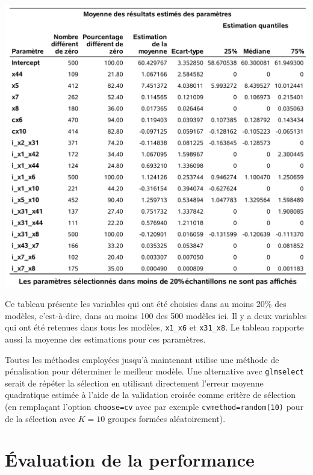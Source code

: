 \documentclass[
  11pt,
  letterpaper,
]{book}
\theoremstyle{definition}
\theoremstyle{definition}
\theoremstyle{definition}
\theoremstyle{definition}
\theoremstyle{remark}
\begin{document}
\begin{center}\includegraphics[width=0.9\linewidth]{figures/02-select-e13} \end{center}

Ce tableau présente les variables qui ont été choisies dans au moins 20\% des modèles, c'est-à-dire, dans au moins 100 des 500 modèles ici. Il y a deux variables qui ont été retenues dans tous les modèles, \texttt{x1\_x6} et \texttt{x31\_x8}. Le tableau rapporte aussi la moyenne des estimations pour ces paramètres.

Toutes les méthodes employées jusqu'à maintenant utilise une méthode de pénalisation pour déterminer le meilleur modèle. Une alternative avec \texttt{glmselect} serait de répéter la sélection en utilisant directement l'erreur moyenne quadratique estimée à l'aide de la validation croisée comme critère de sélection (en remplaçant l'option \texttt{choose=cv} avec par exemple \texttt{cvmethod=random(10)} pour de la sélection avec \(K=10\) groupes formées aléatoirement).

\hypertarget{uxe9valuation-de-la-performance}{%
\section{Évaluation de la performance}\label{uxe9valuation-de-la-performance}}
\end{document}
